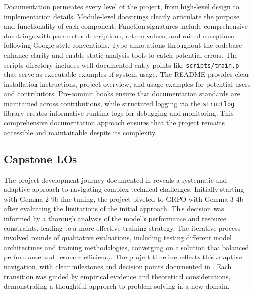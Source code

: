  Documentation permeates every level of the project, from high-level design to implementation details. Module-level docstrings clearly articulate the purpose and functionality of each component. Function signatures include comprehensive docstrings with parameter descriptions, return values, and raised exceptions following Google style conventions. Type annotations throughout the codebase enhance clarity and enable static analysis tools to catch potential errors. The scripts directory includes well-documented entry points like \verb|scripts/train.p| that serve as executable examples of system usage. The README provides clear installation instructions, project overview, and usage examples for potential users and contributors. Pre-commit hooks ensure that documentation standards are maintained across contributions, while structured logging via the \verb|structlog| library creates informative runtime logs for debugging and monitoring. This comprehensive documentation approach ensures that the project remains accessible and maintainable despite its complexity.

\subsection{Capstone LOs} \label{sec:capstone-los}

 The project development journey documented in  reveals a systematic and adaptive approach to navigating complex technical challenges. Initially starting with Gemma-2-9b fine-tuning, the project pivoted to GRPO with Gemma-3-4b after evaluating the limitations of the initial approach. This decision was informed by a thorough analysis of the model's performance and resource constraints, leading to a more effective training strategy. The iterative process involved rounds of qualitative evaluations, including testing different model architectures and training methodologies, converging on a solution that balanced performance and resource efficiency. The project timeline reflects this adaptive navigation, with clear milestones and decision points documented in . Each transition was guided by empirical evidence and theoretical considerations, demonstrating a thoughtful approach to problem-solving in a new domain.

